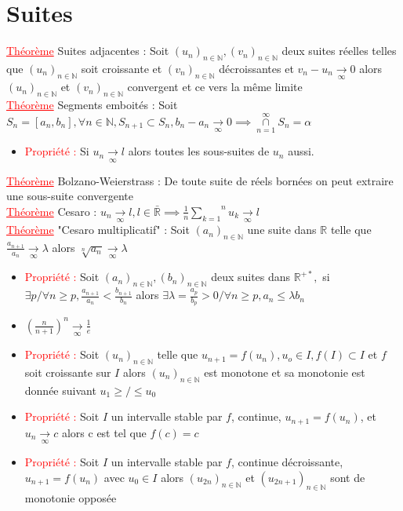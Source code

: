 \documentclass[a4paper, 11pt, french]{article}
\newcommand{\R}{\mathbb{R}}
\newcommand{\N}{\mathbb{N}}
\newcommand{\al}{\alpha}
\newcommand{\la}{\lambda}
\newcommand{\som}[2]{\overset{#2}{\underset{#1}{\sum}}}
\newcommand{\thm}{\textcolor{red}{\underline{Théorème} }}
\newcommand{\ppt}{\textcolor{red}{Propriété : }}
\newcommand{\limit}[1]{\underset{#1}{\rightarrow}}
\newcommand{\inv}[1]{\frac{1}{#1}}
\begin{document}
	\section*{Suites}
	 \thm Suites adjacentes : Soit $(u_n)_{n \in \N}, (v_n)_{n \in \N}$ deux suites réelles telles que $(u_n)_{n \in \N}$ soit croissante et $(v_n)_{n \in \N}$ décroissantes et $v_n-u_n\limit{\infty}0$ alors $(u_n)_{n \in \N}$ et $(v_n)_{n \in \N}$ convergent et ce vers la même limite\\
	 \thm Segments emboités : Soit $S_n=[a_n,b_n], \forall n \in \N, S_{n+1} \subset S_n, b_n-a_n \limit{\infty}0 \implies \overset{\infty}{\underset{n=1}{\cap}} S_n={\al}$
	\begin{itemize}
	  \item \ppt Si $u_n \limit{\infty}l$ alors toutes les sous-suites de $u_n$ aussi.
	\end{itemize}
	 \thm Bolzano-Weierstrass : De toute suite de réels bornées on peut extraire une sous-suite convergente \\
	 \thm Cesaro : $u_n \limit{\infty}l, l \in \bar{\R} \implies \inv{n}\som{k=1}{n}u_k \limit{\infty}l$ \\
	 \thm "Cesaro multiplicatif" : Soit $(a_n)_{n \in \N}$ une suite dans $\R$ telle que $\frac{a_{n+1}}{a_n}\limit{\infty}\la$ alors $\sqrt[n]{a_n}\limit{\infty}\la$

	\begin{itemize}
	  \item \ppt Soit $(a_n)_{n \in \N},(b_n)_{n \in \N}$ deux suites dans $\R^{+*},$ si $\exists p / \forall n \geqslant p, \frac{a_{n+1}}{a_n} < \frac{b_{n+1}}{b_n}$ alors $\exists \la = \frac{a_p}{b_p}>0/ \forall n \geqslant p, a_n \leqslant \la b_n$
	  \item $(\frac{n}{n+1})^n\limit{\infty}\inv{e}$
	  \item \ppt Soit $(u_n)_{n \in \N}$ telle que $u_{n+1}=f(u_n), u_o \in I, f(I) \subset I$ et $f$ soit croissante sur $I$ alors $(u_n)_{n \in \N}$ est monotone et sa monotonie est donnée suivant $u_1 \geqslant/\leqslant u_0$
	  \item \ppt Soit $I$ un intervalle stable par $f$, continue, $u_{n+1}=f(u_n)$, et $u_n\limit{\infty}c$ alors c est tel que $f(c)=c$
	  \item \ppt Soit $I$ un intervalle stable par $f$, continue décroissante, $u_{n+1}=f(u_n)$ avec $u_0 \in I$ alors $(u_{2n})_{n \in \N}$ et $(u_{2n+1})_{n \in \N}$ sont de monotonie opposée
	\end{itemize}
\end{document}
